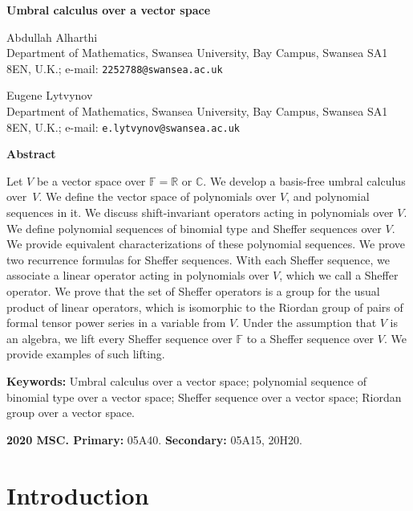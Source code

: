 \documentclass[12pt]{article}
\theoremstyle{remark}
\theoremstyle{remark}
\theoremstyle{remark}
\begin{document}
\begin{center}{\Large \bf Umbral calculus over a vector space}
\end{center}

{\large Abdullah Alharthi}\\ Department of Mathematics, Swansea University, Bay Campus, Swansea SA1 8EN, U.K.;
e-mail: \texttt{2252788@swansea.ac.uk}\vspace{2mm}



{\large Eugene Lytvynov}\\ Department of Mathematics, Swansea University, Bay Campus, Swansea SA1 8EN, U.K.;
e-mail: \texttt{e.lytvynov@swansea.ac.uk}\vspace{2mm}


{\small
\begin{center}
{\bf Abstract}
 \end{center}
 
\noindent Let $V$ be a vector space over $\mathbb F=\mathbb R$ or $\mathbb C$. We develop a basis-free umbral calculus over~$V$. We define the vector space of polynomials over $V$, and polynomial sequences in it. We discuss shift-invariant operators acting in polynomials over $V$. We define polynomial sequences of binomial type and Sheffer sequences over $V$. We provide equivalent characterizations of these polynomial sequences. We prove two recurrence formulas for Sheffer sequences. With each Sheffer sequence, we associate a linear operator acting in polynomials over $V$, which we call a Sheffer operator. We prove that the set of Sheffer operators is a group for the usual product of linear operators, which is isomorphic to the Riordan group of pairs of formal tensor power series in a variable from $V$. Under the assumption that $V$ is an algebra, we 
lift every Sheffer sequence over $\mathbb F$ to a Sheffer sequence over $V$. We provide examples of such  lifting. }\vspace{2mm}
 
 {\bf Keywords:} Umbral calculus over a vector space; polynomial sequence of binomial type over a vector space; Sheffer sequence over a vector space; Riordan group over a vector space. 
 
  \vspace{2mm}

{\bf 2020 MSC. Primary:} 05A40. {\bf Secondary:} 05A15, 20H20.

\section{Introduction}
\end{document}
